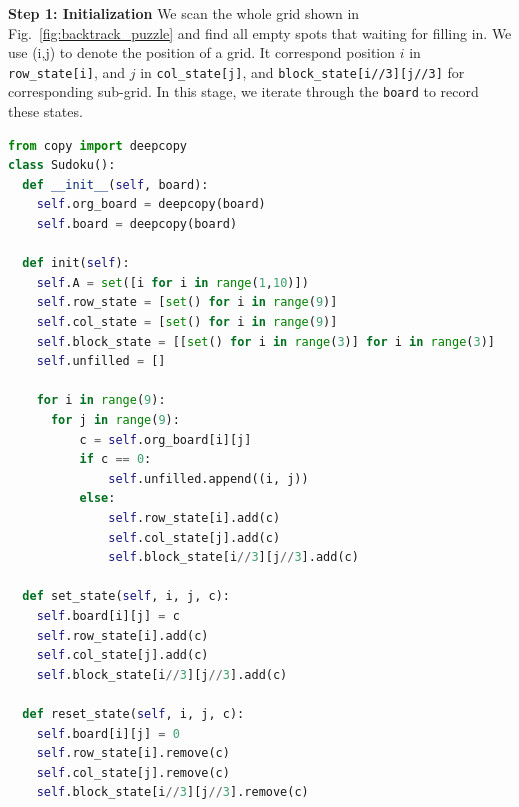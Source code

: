 \documentclass[../main.tex]{subfiles}
\begin{document}
\textbf{Step 1: Initialization} We scan the whole grid shown in Fig.~\ref{fig:backtrack_puzzle} and find all empty spots that waiting for filling in.  
We use (i,j) to denote the position of a grid. It correspond position $i$ in \texttt{row\_state[i]}, and $j$ in \texttt{col\_state[j]}, and \texttt{block\_state[i//3][j//3]} for corresponding sub-grid.  In this stage, we iterate through the 
\texttt{board} to record these states.
\begin{lstlisting}[language=Python]
from copy import deepcopy
class Sudoku():
  def __init__(self, board):
    self.org_board = deepcopy(board)
    self.board = deepcopy(board)
    
  def init(self):
    self.A = set([i for i in range(1,10)])
    self.row_state = [set() for i in range(9)]
    self.col_state = [set() for i in range(9)]
    self.block_state = [[set() for i in range(3)] for i in range(3)]
    self.unfilled = []

    for i in range(9):
      for j in range(9):
          c = self.org_board[i][j]
          if c == 0:
              self.unfilled.append((i, j))
          else:
              self.row_state[i].add(c)
              self.col_state[j].add(c)
              self.block_state[i//3][j//3].add(c)
  
  def set_state(self, i, j, c):
    self.board[i][j] = c
    self.row_state[i].add(c)
    self.col_state[j].add(c)
    self.block_state[i//3][j//3].add(c)
    
  def reset_state(self, i, j, c):
    self.board[i][j] = 0
    self.row_state[i].remove(c)
    self.col_state[j].remove(c)
    self.block_state[i//3][j//3].remove(c)
\end{lstlisting}
  
\end{document}
